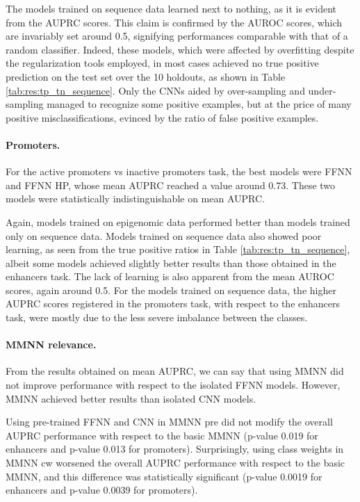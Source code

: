 \documentclass{article}
\begin{document}
The models trained on sequence data learned next to nothing, as it is evident from the AUPRC scores. This claim is confirmed by the AUROC scores, which are invariably set around 0.5, signifying performances comparable with that of a random classifier. Indeed, these models, which were affected by overfitting despite the regularization tools employed, in most cases achieved no true positive prediction on the test set over the 10 holdouts, as shown in Table \ref{tab:res:tp_tn_sequence}. Only the CNNs aided by over-sampling and under-sampling managed to recognize some positive examples, but at the price of many positive misclassifications, evinced by the ratio of false positive examples.

\paragraph{Promoters.} For the active promoters vs inactive promoters task, the best models were FFNN and FFNN HP, whose mean AUPRC reached a value around 0.73. These two models were statistically indistinguishable on mean AUPRC.

Again, models trained on epigenomic data performed better than models trained only on sequence data. Models trained on sequence data also showed poor learning, as seen from the true positive ratios in Table \ref{tab:res:tp_tn_sequence}, albeit some models achieved slightly better results than those obtained in the enhancers task. The lack of learning is also apparent from the mean AUROC scores, again around 0.5. For the models trained on sequence data, the higher AUPRC scores registered in the promoters task, with respect to the enhancers task, were mostly due to the less severe imbalance between the classes.   

\paragraph{MMNN relevance.} From the results obtained on mean AUPRC, we can say that using MMNN did not improve performance with respect to the isolated FFNN models. However, MMNN achieved better results than isolated CNN models.

Using pre-trained FFNN and CNN in MMNN pre did not modify the overall AUPRC performance with respect to the basic MMNN (p-value 0.019 for enhancers and p-value 0.013 for promoters). Surprisingly, using class weights in MMNN cw worsened the overall AUPRC performance with respect to the basic MMNN, and this difference was statistically significant (p-value 0.0019 for enhancers and p-value 0.0039 for promoters).
\end{document}
